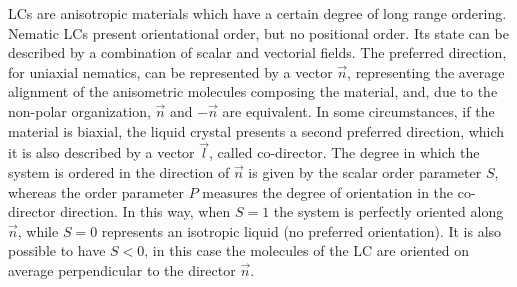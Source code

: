 \documentclass[final,5p,times,twocolumn]{elsarticle}
\begin{document}
LCs are anisotropic materials which have a certain degree of
long range ordering. Nematic LCs present orientational order, but no
positional order. Its state can be described by a combination of scalar and vectorial fields.  The preferred direction, for uniaxial nematics, can be represented by a vector $\vec{n}$, representing the average alignment of the anisometric molecules composing the material, and, due to the non-polar organization, $\vec{n}$ and
$-\vec{n}$ are equivalent. In some circumstances, if the material is biaxial, the
liquid crystal presents a second preferred direction, which it is also
described by a vector $\vec{l}$, called co-director. The degree in which the system is ordered in the direction of $\vec{n}$ is given by
the scalar order parameter $S$, whereas the order parameter $P$
measures the degree of orientation in the co-director direction. In this way, when $S=1$ the system is
perfectly oriented along $\vec{n}$, while $S=0$ represents an isotropic liquid (no preferred orientation). It is also possible to have $S <0$, in this case the molecules of the LC are oriented on average perpendicular to the director $\vec{n}$. 
\end{document}
